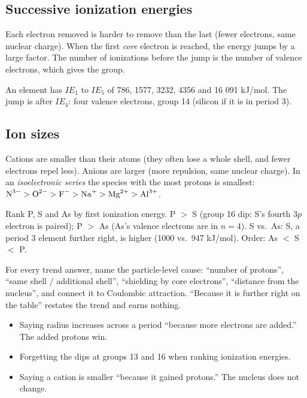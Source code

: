 \documentclass[11pt]{article}
\begin{document}
\subsection{Successive ionization energies}
Each electron removed is harder to remove than the last (fewer electrons, same nuclear charge). When the first \emph{core} electron is reached, the energy jumps by a large factor. The number of ionizations before the jump is the number of valence electrons, which gives the group.

 An element has $IE_1$ to $IE_5$ of 786, 1577, 3232, 4356 and 16 091 kJ/mol. The jump is after $IE_4$: four valence electrons, group 14 (silicon if it is in period 3).

\subsection{Ion sizes}
Cations are smaller than their atoms (they often lose a whole shell, and fewer electrons repel less). Anions are larger (more repulsion, same nuclear charge). In an \emph{isoelectronic series} the species with the most protons is smallest: $\ce{N^3-} > \ce{O^2-} > \ce{F-} > \ce{Na+} > \ce{Mg^2+} > \ce{Al^3+}$.

 Rank P, S and As by first ionization energy. P $>$ S (group 16 dip: S's fourth $3p$ electron is paired); P $>$ As (As's valence electrons are in $n = 4$). S vs.\ As: S, a period 3 element further right, is higher (1000 vs.\ 947 kJ/mol). Order: As $<$ S $<$ P.

\frph For every trend answer, name the particle-level cause: ``number of protons'', ``same shell / additional shell'', ``shielding by core electrons'', ``distance from the nucleus'', and connect it to Coulombic attraction. ``Because it is further right on the table'' restates the trend and earns nothing.

\errorsh
\begin{itemize}
\item Saying radius increases across a period ``because more electrons are added.'' The added protons win.
\item Forgetting the dips at groups 13 and 16 when ranking ionization energies.
\item Saying a cation is smaller ``because it gained protons.'' The nucleus does not change.
\end{itemize}
\end{document}
